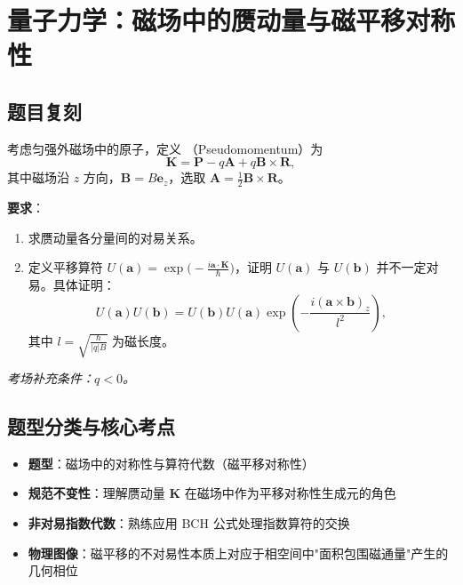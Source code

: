 \newpage
\section[量子力学：磁场中的赝动量与磁平移对称性]{量子力学：磁场中的赝动量与磁平移对称性}
\label{sec:magnetic-translation}

\subsection{题目复刻}

\begin{modelbox}[磁场中的赝动量与平移算符]
考虑匀强外磁场中的原子，定义 （Pseudomomentum）为
\[
\bm{K} = \bm{P} - q\bm{A} + q\bm{B} \times \bm{R},
\]
其中磁场沿 $z$ 方向，$\bm{B} = B \bm{e}_z$，选取  $\bm{A} = \frac{1}{2}\bm{B} \times \bm{R}$。

\textbf{要求}：
\begin{enumerate}[nosep]
    \item 求赝动量各分量间的对易关系。
    \item 定义平移算符 $U(\bm{a}) = \exp\bigl(-\frac{i\bm{a} \cdot \bm{K}}{\hbar}\bigr)$，证明 $U(\bm{a})$ 与 $U(\bm{b})$ 并不一定对易。具体证明：
    \[
    U(\bm{a})U(\bm{b}) = U(\bm{b})U(\bm{a}) \exp\left(-\frac{i(\bm{a} \times \bm{b})_z}{l^2}\right),
    \]
    其中 $l = \sqrt{\frac{\hbar}{|q|B}}$ 为磁长度。
\end{enumerate}
\textit{考场补充条件：$q < 0$。}
\end{modelbox}

\subsection{题型分类与核心考点}

\begin{insightbox}[核心考点]
\begin{itemize}[nosep]
    \item \textbf{题型}：磁场中的对称性与算符代数（磁平移对称性）
    \item \textbf{规范不变性}：理解赝动量 $\bm{K}$ 在磁场中作为平移对称性生成元的角色
    \item \textbf{非对易指数代数}：熟练应用 BCH 公式处理指数算符的交换
    \item \textbf{物理图像}：磁平移的不对易性本质上对应于相空间中"面积包围磁通量"产生的几何相位
\end{itemize}
\end{insightbox}

